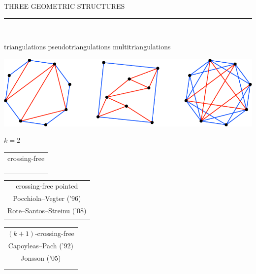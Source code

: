 \documentclass[12pt,titlepage,landscape,a4paper]{article}
\newcommand{\textemoyen}{\fontsize{23}{27}\selectfont}
\newenvironment{slide}[1]
{
\newpage
\begin{center}
{\blue \textemoyen \uppercase{#1}}\\
\end{center}
\vspace{-1cm}
\rule{\textwidth}{0.5 pt}\\
\vspace{-.8cm}
}
{\vspace*{-3cm}}
\newcommand{\violet}{\color{violet}} %
\newcommand{\blue}{\color{blue}} %
\newcommand{\papier}[1]{{\violet\fontsize{15}{20}\selectfont #1}} %
\begin{document}
\begin{slide}{Three geometric structures}

\hspace{1.6cm} triangulations \hspace{3.4cm} pseudotriangulations \hspace{2.5cm} multitriangulations\\
\begin{center}\includegraphics[scale=1.9]{geometricStructures1}\end{center}
\vspace{-1.08cm} \hspace*{25.7cm} ${k=2}$

\hspace{1.7cm} 
\begin{tabular}[t]{c} crossing-free \\ \\[-.3cm] \\ \\  \end{tabular} 
\hspace{3.4cm} 
\begin{tabular}[t]{c} crossing-free pointed \\ \papier{Pocchiola--Vegter ('96)} \\[-.3cm] \papier{Rote--Santos--Streinu ('08)} \\ \\  \end{tabular}
\hspace{2cm} 
\begin{tabular}[t]{c} $(k+1)$-crossing-free \\ \papier{Capoyleas--Pach ('92)} \\[-.3cm] \papier{Jonsson ('05)} \\ \\ \\  \end{tabular}

\end{slide}

\end{document}
